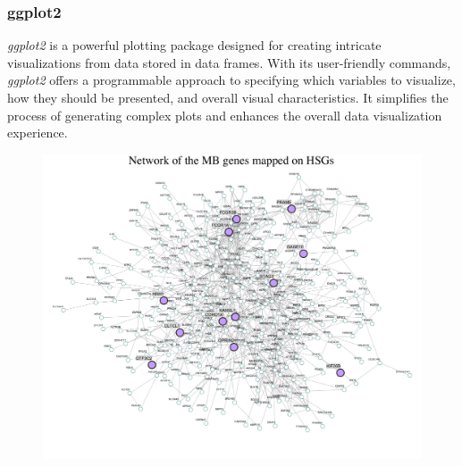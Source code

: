 \documentclass[10pt]{SelfArx} %
\newcommand{\beginsupplement}{%
        \setcounter{table}{0}
        \renewcommand{\thetable}{S\arabic{table}}%
        \setcounter{figure}{0}
        \renewcommand{\thefigure}{S\arabic{figure}}%
     }
\begin{document}
\subsubsection*{ggplot2}\label{ggplot2}
\textit{ggplot2} \cite{ggplot2} is a powerful plotting package designed for creating intricate visualizations from data stored in data frames. With its user-friendly commands, \textit{ggplot2} offers a programmable approach to specifying which variables to visualize, how they should be presented, and overall visual characteristics. It simplifies the process of generating complex plots and enhances the overall data visualization experience.










\newpage
\beginsupplement

\begin{figure}
    \centering    \includegraphics[width=1\textwidth]{project-proposal/figures/string_interactions_short.tsv2.png}
    \caption{}
    \label{fig:network}    
\end{figure}
\end{document}

